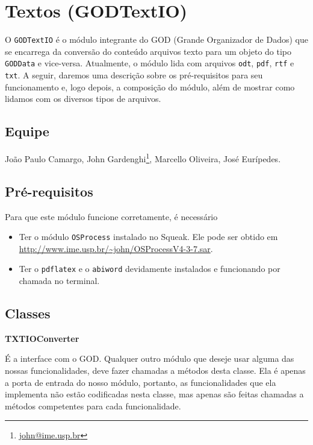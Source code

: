 \section{Textos (GODTextIO)}

O \verb|GODTextIO| é o módulo integrante do GOD (Grande Organizador de
Dados) que se encarrega da conversão do conteúdo arquivos texto para
um objeto do tipo \verb|GODData| e vice-versa. Atualmente, o módulo
lida com arquivos \verb|odt|, \verb|pdf|, \verb|rtf| e \verb|txt|. A
seguir, daremos uma descrição sobre os pré-requisitos para seu
funcionamento e, logo depois, a composição do módulo, além de mostrar
como lidamos com os diversos tipos de arquivos.

\subsection{Equipe}

João Paulo Camargo, John
Gardenghi\footnote{\href{mailto:john@ime.usp.br}{john@ime.usp.br}},
Marcello Oliveira, José Eurípedes.


\subsection{Pré-requisitos}

Para que este módulo funcione corretamente, é necessário
\begin{itemize}
\item Ter o módulo \verb|OSProcess| instalado no Squeak. Ele pode ser
  obtido em \url{http://www.ime.usp.br/~john/OSProcessV4-3-7.sar}.
\item Ter o \verb|pdflatex| e o \verb|abiword| devidamente instalados
  e funcionando por chamada no terminal.
\end{itemize}

\subsection{Classes}

\vspace{1em}
\textbf{TXTIOConverter}

É a interface com o GOD. Qualquer outro módulo que deseje usar alguma
das nossas funcionalidades, deve fazer chamadas a métodos desta
classe. Ela é apenas a porta de entrada do nosso módulo, portanto, as
funcionalidades que ela implementa não estão codificadas nesta classe,
mas apenas são feitas chamadas a métodos competentes para cada
funcionalidade.

